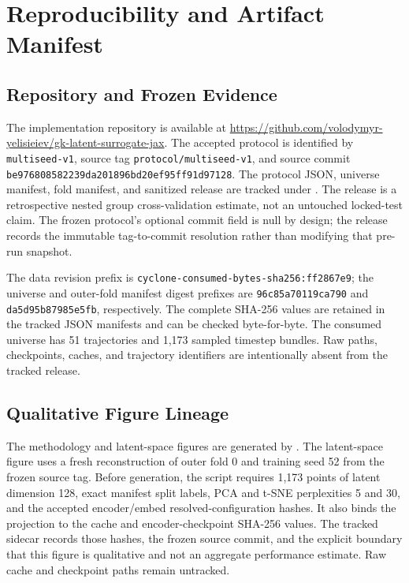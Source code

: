 \cleardoubleoddpage
\chapter{Reproducibility and Artifact Manifest}
\label{app:reproducibility}

\section{Repository and Frozen Evidence}

The implementation repository is available at
\url{https://github.com/volodymyr-yelisieiev/gk-latent-surrogate-jax}. The accepted protocol is
identified by \texttt{multiseed-v1}, source tag \texttt{protocol/multiseed-v1}, and source commit
\texttt{be976808582239da201896bd20ef95ff91d97128}. The protocol JSON, universe manifest, fold
manifest, and sanitized release are tracked under . The release is a
retrospective nested group cross-validation estimate, not an untouched locked-test claim.
The frozen protocol's optional commit field is null by design; the release records the immutable
tag-to-commit resolution rather than modifying that pre-run snapshot.

The data revision prefix is \texttt{cyclone-consumed-bytes-sha256:ff2867e9}; the universe and
outer-fold manifest digest prefixes are \texttt{96c85a70119ca790} and
\texttt{da5d95b87985e5fb}, respectively. The complete SHA-256 values are retained in the tracked
JSON manifests and can be checked byte-for-byte. The consumed universe
has 51 trajectories and 1,173 sampled timestep bundles. Raw paths, checkpoints, caches, and
trajectory identifiers are intentionally absent from the tracked release.

\section{Qualitative Figure Lineage}

The methodology and latent-space figures are generated by
. The latent-space figure uses a fresh reconstruction
of outer fold 0 and training seed 52 from the frozen source tag. Before generation, the script
requires 1,173 points of latent dimension 128, exact manifest split labels, PCA and t-SNE
perplexities 5 and 30, and the accepted encoder/embed resolved-configuration hashes. It also binds
the projection to the cache and encoder-checkpoint SHA-256 values. The tracked sidecar
 records those hashes, the frozen
source commit, and the explicit boundary that this figure is qualitative and not an aggregate
performance estimate. Raw cache and checkpoint paths remain untracked.

